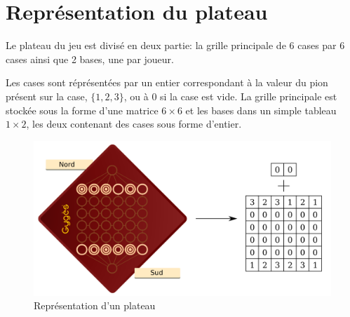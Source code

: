 \section{Représentation du plateau}

	Le plateau du jeu est divisé en deux partie: la grille principale de 6 cases par 6 cases
	ainsi que 2 bases, une par joueur.

	\vspace{1em}
	Les cases sont réprésentées par un entier correspondant à la valeur du pion présent sur la case,
	$\{1,2,3\}$, ou à $0$ si la case est vide.
	La grille principale est stockée sous la forme d'une matrice $6\times{}6$ et les bases dans un
	simple tableau $1\times{}2$, les deux contenant des cases sous forme d'entier.

	\begin{figure}[ht]
			\centering
			\includegraphics[width=\textwidth]{images/representation2.png}
			\caption{Représentation d'un plateau}
			\label{fig:plateau}
	\end{figure}

